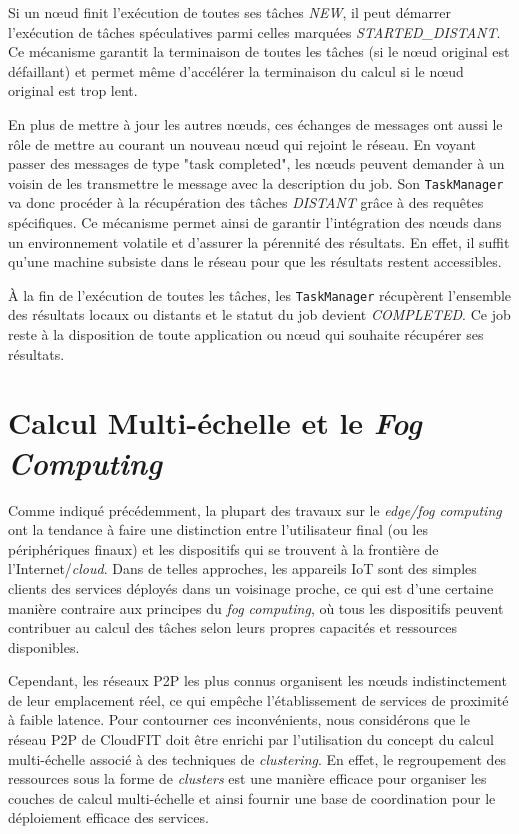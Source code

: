 Si un n{\oe}ud finit l'exécution de toutes ses tâches \textit{NEW}, il peut démarrer l'exécution de tâches spéculatives parmi celles marquées \textit{STARTED\_DISTANT}. Ce mécanisme garantit la terminaison de toutes les tâches (si le n{\oe}ud original est défaillant) et permet même d'accélérer la terminaison du calcul si le n{\oe}ud original est trop lent.

En plus de mettre à jour les autres n{\oe}uds, ces échanges de messages ont aussi le rôle de mettre au courant un nouveau n{\oe}ud qui rejoint le réseau. En voyant passer des messages de type "task completed", les n{\oe}uds peuvent demander à un voisin de les transmettre le message avec la description du job. Son \texttt{TaskManager} va donc procéder à la récupération des tâches \textit{DISTANT} grâce à des requêtes spécifiques. Ce mécanisme permet ainsi de garantir l'intégration des n{\oe}uds dans un environnement volatile et d'assurer la pérennité des résultats. En effet, il suffit qu'une machine subsiste dans le réseau pour que les résultats restent accessibles.

À la fin de l'exécution de toutes les tâches, les \texttt{TaskManager} récupèrent l'ensemble des résultats locaux ou distants et le statut du job devient \textit{COMPLETED}. Ce job reste à la disposition de toute application ou n{\oe}ud qui souhaite récupérer ses résultats.


\section{Calcul Multi-échelle et le \textit{Fog Computing}}

Comme indiqué précédemment, la plupart des travaux sur le \textit{edge/fog computing} ont la tendance à faire une distinction entre l'utilisateur final (ou les périphériques finaux) et les dispositifs qui se trouvent à la frontière de l'Internet/\textit{cloud}. Dans de telles approches, les appareils IoT sont des simples clients des services déployés dans un voisinage proche, ce qui est d'une certaine manière contraire aux principes du \textit{fog computing}, où tous les dispositifs peuvent contribuer au calcul des tâches selon leurs propres capacités et ressources disponibles. 

Cependant, les réseaux P2P les plus connus organisent les n{\oe}uds indistinctement de leur emplacement réel, ce qui empêche l'établissement de services de proximité à faible latence. Pour contourner ces inconvénients, nous considérons que le réseau P2P de CloudFIT doit être enrichi par l'utilisation du concept du calcul multi-échelle \cite{Rottenberg2012,Rottenberg2014}  associé à des techniques de \textit{clustering}. En effet, le regroupement des ressources sous la forme de \textit{clusters} est une manière efficace pour organiser les couches de calcul multi-échelle et ainsi fournir une base de coordination pour le déploiement efficace des services.

